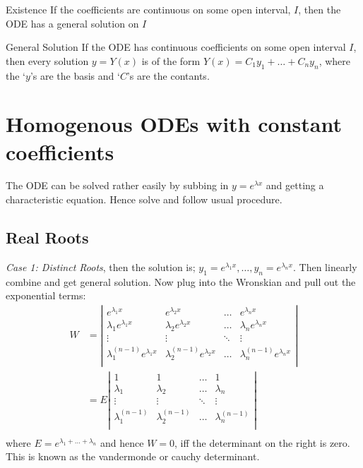 \documentclass{article}
\renewcommand{\l}{\lambda}
\begin{document}
\noindent\begin{theorem}{Existence}{}
   If the coefficients are continuous on some open interval, $I$, then the ODE has a general solution on $I$
\end{theorem}\vspace{10pt}

\noindent\begin{theorem}{General Solution}{}
   If the ODE has continuous coefficients on some open interval $I$, then every solution $y = Y(x)$  is of the form $\displaystyle{Y(x) = C_1y_1 + \dots + C_ny_n}$, where the `$y$'s are the basis and `$C$'s are the contants.
\end{theorem}\vspace{10pt}

\section{Homogenous ODEs with constant coefficients}
The ODE can be solved rather easily by subbing in $y = e^{\l x}$ and getting a characteristic equation. Hence solve and follow usual procedure.

\subsection{Real Roots}
\textit{Case 1: Distinct Roots}, then the solution is; $y_1 = e^{\l_1 x}, \dots, y_n = e^{\l_n x}$. Then linearly combine and get general solution. Now plug into the Wronskian and pull out the exponential terms:
\begin{align*}
  W &= \left|\begin{matrix}
    e^{\l_1 x} & e^{\l_2 x} & \dots & e^{\l_n x} \\
    \l_1e^{\l_1 x} & \l_2e^{\l_2 x} & \dots & \l_ne^{\l_n x} \\
    \vdots & \vdots & \ddots & \vdots \\
    \l_1^{(n-1)}e^{\l_1 x} & \l_2^{(n-1)}e^{\l_2 x} & \dots & \l_n^{(n-1)}e^{\l_n x}\\
  \end{matrix}\right| \\
  &= E\left|\begin{matrix}
    1 & 1 & \dots & 1 \\
    \l_1 & \l_2 & \dots & \l_n \\
    \vdots & \vdots & \ddots & \vdots \\
    \l_1^{(n-1)} & \l_2^{(n-1)} & \dots & \l_n^{(n-1)}\\
  \end{matrix}\right| \\
\end{align*}
where $E = e^{\l_1 + \dots + \l_n}$ and hence $W = 0$, iff the determinant on the right is zero. This is known as the vandermonde or cauchy determinant.\\
\end{document}
